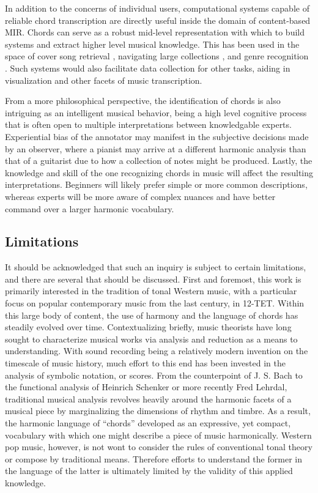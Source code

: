 In addition to the concerns of individual users, computational systems capable of reliable chord transcription are directly useful inside the domain of content-based MIR.
Chords can serve as a robust mid-level representation with which to build systems and extract higher level musical knowledge.
This has been used in the space of cover song retrieval \cite{Juan?}, navigating large collections \cite{alan?}, and genre recognition \cite{anglade}.
Such systems would also facilitate data collection for other tasks, aiding in visualization and other facets of music transcription.

From a more philosophical perspective, the identification of chords is also intriguing as an intelligent musical behavior, being a high level cognitive process that is often open to multiple interpretations between knowledgable experts.
Experiential bias of the annotator may manifest in the subjective decisions made by an observer, where a pianist may arrive at a different harmonic analysis than that of a guitarist due to how a collection of notes might be produced.
Lastly, the knowledge and skill of the one recognizing chords in music will affect the resulting interpretations.
Beginners will likely prefer simple or more common descriptions, whereas experts will be more aware of complex nuances and have better command over a larger harmonic vocabulary.


\subsection{Limitations}
\label{subsec:limitations}

It should be acknowledged that such an inquiry is subject to certain limitations, and there are several that should be discussed.
First and foremost, this work is primarily interested in the tradition of tonal Western music, with a particular focus on popular contemporary music from the last century, in 12-TET.
Within this large body of content, the use of harmony and the language of chords has steadily evolved over time.
Contextualizing briefly, music theorists have long sought to characterize musical works via analysis and reduction as a means to understanding.
With sound recording being a relatively modern invention on the timescale of music history, much effort to this end has been invested in the analysis of symbolic notation, or scores.
From the counterpoint of J. S. Bach to the functional analysis of Heinrich Schenker or more recently Fred Lehrdal, traditional musical analysis revolves heavily around the harmonic facets of a musical piece by marginalizing the dimensions of rhythm and timbre.
As a result, the harmonic language of ``chords'' developed as an expressive, yet compact, vocabulary with which one might describe a piece of music harmonically.
Western pop music, however, is not wont to consider the rules of conventional tonal theory or compose by traditional means.
Therefore efforts to understand the former in the language of the latter is ultimately limited by the validity of this applied knowledge.

